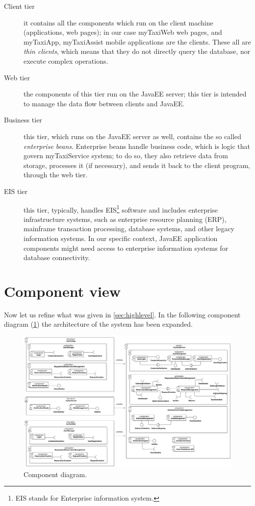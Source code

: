 \begin{description}
	\item [Client tier] it contains all the components which run on the client machine (applications, web pages); in our case myTaxiWeb web pages, and myTaxiApp, myTaxiAssist mobile applications are the clients. These all are \emph{thin clients}, which means that they do not directly query the database, nor execute complex operations. 
	
	\item [Web tier] the components of this tier run on the JavaEE server; this tier is intended to manage the data flow between clients and JavaEE.

	\item [Business tier] this tier, which runs on the JavaEE server as well, contains the so called \emph{enterprise beans}. Enterprise beans handle business code, which is logic that govern myTaxiService system; to do so, they also retrieve data from storage, processes it (if necessary), and sends it back to the client program, through the web tier.

	\item [EIS tier] this tier, typically, handles EIS\footnote{EIS stands for Enterprise information system.} software and includes enterprise infrastructure systems, such as enterprise resource planning (ERP), mainframe transaction processing, database systems, and other legacy information systems. In our specific context, JavaEE application components might need access to enterprise information systems for database connectivity.
	
\end{description}


\section{Component view}\label{sec:componentView}
Now let us refine what was given in \cref{sec:highlevel}. In the following component diagram (\cref{fig:component}) the architecture of the system has been expanded.

\begin{figure}%
	\centering%
	\includegraphics[width=\textwidth]{img/ComponentView__ComponentDiagram_1}%
	\caption{Component diagram.}\label{fig:component}%
\end{figure}

